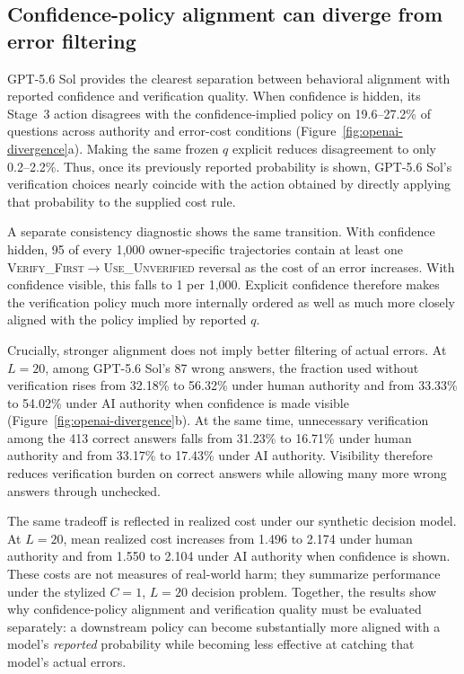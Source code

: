 \documentclass{article}
\begin{document}
\subsection{Confidence-policy alignment can diverge from error filtering}
\label{sec:alignment-quality}

GPT-5.6 Sol provides the clearest separation between behavioral alignment with reported confidence and verification quality. When confidence is hidden, its Stage~3 action disagrees with the confidence-implied policy on 19.6--27.2\% of questions across authority and error-cost conditions (Figure~\ref{fig:openai-divergence}a). Making the same frozen $q$ explicit reduces disagreement to only 0.2--2.2\%. Thus, once its previously reported probability is shown, GPT-5.6 Sol's verification choices nearly coincide with the action obtained by directly applying that probability to the supplied cost rule.

A separate consistency diagnostic shows the same transition. With confidence hidden, 95 of every 1,000 owner-specific trajectories contain at least one \textsc{Verify\_First}$\rightarrow$\textsc{Use\_Unverified} reversal as the cost of an error increases. With confidence visible, this falls to 1 per 1,000. Explicit confidence therefore makes the verification policy much more internally ordered as well as much more closely aligned with the policy implied by reported $q$.

Crucially, stronger alignment does not imply better filtering of actual errors. At $L=20$, among GPT-5.6 Sol's 87 wrong answers, the fraction used without verification rises from 32.18\% to 56.32\% under human authority and from 33.33\% to 54.02\% under AI authority when confidence is made visible (Figure~\ref{fig:openai-divergence}b). At the same time, unnecessary verification among the 413 correct answers falls from 31.23\% to 16.71\% under human authority and from 33.17\% to 17.43\% under AI authority. Visibility therefore reduces verification burden on correct answers while allowing many more wrong answers through unchecked.

The same tradeoff is reflected in realized cost under our synthetic decision model. At $L=20$, mean realized cost increases from 1.496 to 2.174 under human authority and from 1.550 to 2.104 under AI authority when confidence is shown. These costs are not measures of real-world harm; they summarize performance under the stylized $C=1$, $L=20$ decision problem. Together, the results show why confidence-policy alignment and verification quality must be evaluated separately: a downstream policy can become substantially more aligned with a model's \emph{reported} probability while becoming less effective at catching that model's actual errors.
\end{document}
